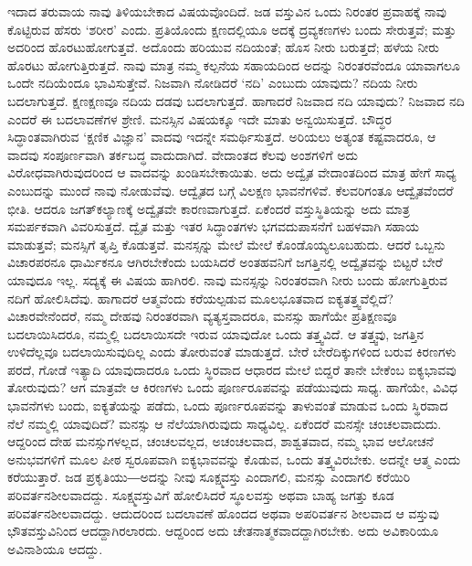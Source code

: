 ಇದಾದ ತರುವಾಯ ನಾವು ತಿಳಿಯಬೇಕಾದ ವಿಷಯವೊಂದಿದೆ. ಜಡ ವಸ್ತುವಿನ ಒಂದು ನಿರಂತರ ಪ್ರವಾಹಕ್ಕೆ ನಾವು ಕೊಟ್ಟಿರುವ ಹೆಸರು ‘ಶರೀರ’ ಎಂದು. ಪ್ರತಿಯೊಂದು ಕ್ಷಣದಲ್ಲಿಯೂ ಅದಕ್ಕೆ ದ್ರವ್ಯಕಣಗಳು ಬಂದು ಸೇರುತ್ತವೆ; ಮತ್ತು ಅದರಿಂದ ಹೊರಟುಹೋಗುತ್ತವೆ. ಅದೊಂದು ಹರಿಯುವ ನದಿಯಂತೆ; ಹೊಸ ನೀರು ಬರುತ್ತದೆ; ಹಳೆಯ ನೀರು ಹೊರಟು ಹೋಗುತ್ತಿರುತ್ತದೆ. ನಾವು ಮಾತ್ರ ನಮ್ಮ ಕಲ್ಪನೆಯ ಸಹಾಯದಿಂದ ಅದನ್ನು ನಿರಂತರವೆಂದೂ ಯಾವಾಗಲೂ ಒಂದೇ ನದಿಯೆಂದೂ ಭಾವಿಸುತ್ತೇವೆ. ನಿಜವಾಗಿ ನೋಡಿದರೆ ‘ನದಿ’ ಎಂಬುದು ಯಾವುದು? ನದಿಯ ನೀರು ಬದಲಾಗುತ್ತದೆ. ಕ್ಷಣಕ್ಷಣವೂ ನದಿಯ ದಡವು ಬದಲಾಗುತ್ತದೆ. ಹಾಗಾದರೆ ನಿಜವಾದ ನದಿ ಯಾವುದು? ನಿಜವಾದ ನದಿ ಎಂದರೆ ಈ ಬದಲಾವಣೆಗಳ ಶ್ರೇಣಿ. ಮನಸ್ಸಿನ ವಿಷಯಕ್ಕೂ ಇದೇ ಮಾತು ಅನ್ವಯಿಸುತ್ತದೆ. ಬೌದ್ಧರ ಸಿದ್ಧಾಂತವಾಗಿರುವ ‘ಕ್ಷಣಿಕ ವಿಜ್ಞಾನ’ ವಾದವು ಇದನ್ನೇ ಸಮರ್ಥಿಸುತ್ತದೆ. ಅರಿಯಲು ಅತ್ಯಂತ ಕಷ್ಟವಾದರೂ, ಆ ವಾದವು ಸಂಪೂರ್ಣವಾಗಿ ತರ್ಕಬದ್ಧ ವಾದುದಾಗಿದೆ. ವೇದಾಂತದ ಕೆಲವು ಅಂಶಗಳಿಗೆ ಅದು ವಿರೋಧವಾಗಿರುವುದರಿಂದ ಆ ವಾದವನ್ನು ಖಂಡಿಸಬೇಕಾಯಿತು. ಅದು ಅದ್ವೈತ ವೇದಾಂತದಿಂದ ಮಾತ್ರ ಹೇಗೆ ಸಾಧ್ಯ ಎಂಬುದನ್ನು ಮುಂದೆ ನಾವು ನೋಡುವೆವು. ಆದ್ವೈತದ ಬಗ್ಗೆ ವಿಲಕ್ಷಣ ಭಾವನೆಗಳಿವೆ. ಕೆಲವರಿಗಂತೂ ಆದ್ವೈತವೆಂದರೆ ಭೀತಿ. ಆದರೂ ಜಗತ್​ ಕಲ್ಯಾಣಕ್ಕೆ ಅದ್ವೈತವೇ ಕಾರಣವಾಗುತ್ತದೆ. ಏಕೆಂದರೆ ವಸ್ತುಸ್ಥಿತಿಯನ್ನು ಅದು ಮಾತ್ರ ಸಮರ್ಪಕವಾಗಿ ವಿವರಿಸುತ್ತದೆ. ದ್ವೈತ ಮತ್ತು ಇತರ ಸಿದ್ಧಾಂತಗಳು ಭಗವದುಪಾಸನೆಗೆ ಬಹಳವಾಗಿ ಸಹಾಯ ಮಾಡುತ್ತವೆ; ಮನಸ್ಸಿಗೆ ತೃಪ್ತಿ ಕೊಡುತ್ತವೆ. ಮನಸ್ಸನ್ನು ಮೇಲೆ ಮೇಲೆ ಕೊಂಡೊಯ್ಯಲೂಬಹುದು. ಆದರೆ ಒಬ್ಬನು ವಿಚಾರಪರನೂ ಧಾರ್ಮಿಕನೂ ಆಗಿರಬೇಕೆಂದು ಬಯಸಿದರೆ ಅಂತಹವನಿಗೆ ಜಗತ್ತಿನಲ್ಲಿ ಅದ್ವೈತವನ್ನು ಬಿಟ್ಟರೆ ಬೇರೆ ಯಾವುದೂ ಇಲ್ಲ. ಸದ್ಯಕ್ಕೆ ಈ ವಿಷಯ ಹಾಗಿರಲಿ. ನಾವು ಮನಸ್ಸನ್ನು ನಿರಂತರವಾಗಿ ನೀರು ಬಂದು ಹೋಗುತ್ತಿರುವ ನದಿಗೆ ಹೋಲಿಸಿದೆವು. ಹಾಗಾದರೆ ಆತ್ಮವೆಂದು ಕರೆಯಲ್ಪಡುವ ಮೂಲಭೂತವಾದ ಐಕ್ಯತತ್ತ್ವವೆಲ್ಲಿದೆ? ವಿಚಾರವೇನೆಂದರೆ, ನಮ್ಮ ದೇಹವು ನಿರಂತರವಾಗಿ ವ್ಯತ್ಯಸ್ತವಾದರೂ, ಮನಸ್ಸು ಹಾಗೆಯೇ ಪ್ರತಿಕ್ಷಣವೂ ಬದಲಾಯಿಸಿದರೂ, ನಮ್ಮಲ್ಲಿ ಬದಲಾಯಿಸದೇ ಇರುವ ಯಾವುದೋ ಒಂದು ತತ್ತ್ವವಿದೆ. ಆ ತತ್ತ್ವವು, ಜಗತ್ತಿನ ಉಳಿದೆಲ್ಲವೂ ಬದಲಾಯಿಸುವುದಿಲ್ಲ ಎಂದು ತೋರುವಂತೆ ಮಾಡುತ್ತದೆ. ಬೇರೆ ಬೇರೆ\break ದಿಕ್ಕುಗಳಿಂದ ಬರುವ ಕಿರಣಗಳು ಪರದೆ, ಗೋಡೆ ಇತ್ಯಾದಿ ಯಾವುದಾದರೂ ಒಂದು ಸ್ಥಿರವಾದ ಆಧಾರದ ಮೇಲೆ ಬಿದ್ದರೆ ತಾನೇ ಬೇಕೆಂಬ ಐಕ್ಯಭಾವವು ತೋರುವುದು? ಆಗ ಮಾತ್ರವೇ ಆ ಕಿರಣಗಳು ಒಂದು ಪೂರ್ಣರೂಪವನ್ನು ಪಡೆಯುವುದು ಸಾಧ್ಯ. ಹಾಗೆಯೇ, ವಿವಿಧ ಭಾವನೆಗಳು ಬಂದು, ಐಕ್ಯತೆಯನ್ನು ಪಡೆದು, ಒಂದು ಪೂರ್ಣರೂಪವನ್ನು ತಾಳುವಂತೆ ಮಾಡುವ ಒಂದು ಸ್ಥಿರವಾದ ನೆಲೆ ನಮ್ಮಲ್ಲಿ ಯಾವುದಿದೆ? ಮನಸ್ಸು ಆ ನೆಲೆಯಾಗಿರುವುದು ಸಾಧ್ಯವಿಲ್ಲ. ಏಕೆಂದರೆ ಮನಸ್ಸೇ ಚಂಚಲವಾದುದು. ಆದ್ದರಿಂದ ದೇಹ ಮನಸ್ಸುಗಳಲ್ಲದ, ಚಂಚಲವಲ್ಲದ, ಅಚಂಚಲವಾದ, ಶಾಶ್ವತವಾದ, ನಮ್ಮ ಭಾವ ಆಲೋಚನೆ ಅನುಭವಗಳಿಗೆ ಮೂಲ ಪೀಠ ಸ್ವರೂಪವಾಗಿ ಐಕ್ಯಭಾವವನ್ನು ಕೊಡುವ, ಒಂದು ತತ್ತ್ವವಿರಬೇಕು. ಅದನ್ನೇ ಆತ್ಮ ಎಂದು ಕರೆಯುತ್ತಾರೆ. ಜಡ ಪ್ರಕೃತಿಯು―ಅದನ್ನು ನೀವು ಸೂಕ್ಷ್ಮವಸ್ತು ಎಂದಾಗಲಿ, ಮನಸ್ಸು ಎಂದಾಗಲಿ ಕರೆಯಿರಿ ಪರಿವರ್ತನಶೀಲವಾದದ್ದು. ಸೂಕ್ಷ್ಮವಸ್ತುವಿಗೆ ಹೋಲಿಸಿದರೆ ಸ್ಥೂಲವಸ್ತು ಅಥವಾ ಬಾಹ್ಯ ಜಗತ್ತು ಕೂಡ ಪರಿವರ್ತನಶೀಲವಾದದ್ದು. ಆದುದರಿಂದ ಬದಲಾವಣೆ ಹೊಂದದ ಅಥವಾ ಅಪರಿವರ್ತನ ಶೀಲವಾದ ಆ ವಸ್ತುವು ಭೌತವಸ್ತುವಿನಿಂದ ಆದದ್ದಾಗಿರಲಾರದು. ಆದ್ದರಿಂದ ಅದು ಚೇತನಾತ್ಮಕವಾದದ್ದಾಗಿರಬೇಕು. ಅದು ಅವಿಕಾರಿಯೂ ಅವಿನಾಶಿಯೂ ಆದದ್ದು. 

